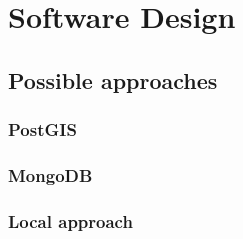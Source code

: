 
\chapter{Software Design}



\section{Possible approaches}


\subsection{PostGIS}


\subsection{MongoDB}


\subsection{Local approach}
